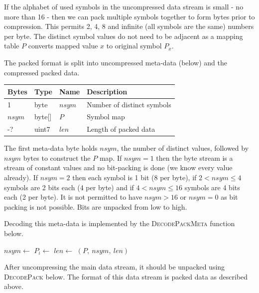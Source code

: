 \documentclass[a4paper]{article}
\begin{document}
If the alphabet of used symbols in the uncompressed data stream is
small - no more than 16 - then we can pack multiple symbols together
to form bytes prior to compression.  This permits 2, 4, 8 and infinite
(all symbols are the same) numbers per byte.  The distinct
symbol values do not need to be adjacent as a mapping table $P$
converts mapped value $x$ to original symbol $P_x$.

The packed format is split into uncompressed meta-data (below) and the compressed packed data.

\begin{table}[h]
\centering
\begin{tabular}{lllp{9cm}}
\textbf{Bytes} & \textbf{Type} & \textbf{Name} & \textbf{Description}\\
\hline
1      & byte   & $nsym$ & Number of distinct symbols\\
$nsym$ & byte[] & $P$    & Symbol map \\
-?     & uint7  & $len$  & Length of packed data
\end{tabular}
\end{table}

The first meta-data byte holds $nsym$, the number of distinct values, followed
by $nsym$ bytes to construct the $P$ map.  If $nsym = 1$ then the byte
stream is a stream of constant values and no bit-packing is done (we
know every value already).  If $nsym = 2$ then each symbol is 1 bit (8
per byte), if $2 < nsym \le 4$ symbols are 2 bits each (4 per byte)
and if $4 < nsym \le 16$ symbols are 4 bits each (2 per byte). It is
not permitted to have $nsym > 16$ or $nsym = 0$ as bit packing is not
possible. Bits are unpacked from low to high.

Decoding this meta-data is implemented by the \textsc{DecodePackMeta}
function below.

\begin{algorithmic}[1]
  \State $nsym \gets $
    \State $P_i \gets $ 
  \EndFor
  \State $len \gets $ 
  \State \Return $(P,\ nsym, \ len)$
\EndFunction
\end{algorithmic}

After uncompressing the main data stream, it should be unpacked using
\textsc{DecodePack} below.  The format of this data stream is packed
data as described above.
\end{document}
